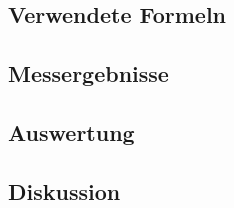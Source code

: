 \documentclass[12pt,a4paper]{article}
\begin{document}
\subsection{Verwendete Formeln}
\subsection{Messergebnisse}
\subsection{Auswertung}
\subsection{Diskussion}
\end{document}
